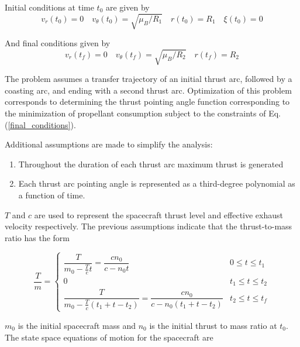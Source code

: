 \noindent Initial conditions at time $t_0$ are given by
\begin{equation}
v_r(t_0) = 0  \quad  v_\theta(t_0) = \sqrt{\mu_B/R_1} \quad r(t_0) = R_1 \quad \xi(t_0) = 0
\label{initial_conditions}
\end{equation}

\noindent And final conditions given by
\begin{equation}
    v_r(t_f) = 0 \quad v_\theta(t_f) = \sqrt{\mu_B/R_2} \quad r(t_f) = R_2
    \label{final_conditions}
\end{equation}

\noindent The problem assumes a transfer trajectory of an initial thrust arc, followed by a coasting arc, and ending with a second thrust arc. 
Optimization of this problem corresponds to determining the thrust pointing angle function corresponding to the minimization of propellant consumption 
subject to the constraints of Eq. (\ref{final_conditions}).\newline

\noindent Additional assumptions are made to simplify the analysis:

\begin{enumerate}
    \item Throughout the duration of each thrust arc maximum thrust is generated
    \item Each thrust arc pointing angle is represented as a third-degree polynomial as a function of time.
\end{enumerate}

\noindent $T$ and $c$ are used to represent the spacecraft thrust level and effective exhaust velocity respectively. The previous assumptions
indicate that the thrust-to-mass ratio has the form

\begin{equation}
\dfrac{T}{m} = \begin{cases} 
    \dfrac{T}{m_0-\frac{T}{c}t} = \dfrac{cn_0}{c-n_0t} & 0\leq t \leq t_1 \\
    0 & t_1\leq t \leq t_2 \\
    \dfrac{T}{m_0-\frac{T}{c}(t_1+t-t_2)} = \dfrac{cn_0}{c-n_0(t_1+t-t_2)} & t_2\leq t \leq t_f 
  \end{cases}
  \label{Toverm}
\end{equation}

\noindent $m_0$ is the initial spacecraft mass and $n_0$ is the initial thrust to mass ratio at $t_0$.
The state space equations of motion for the spacecraft are


